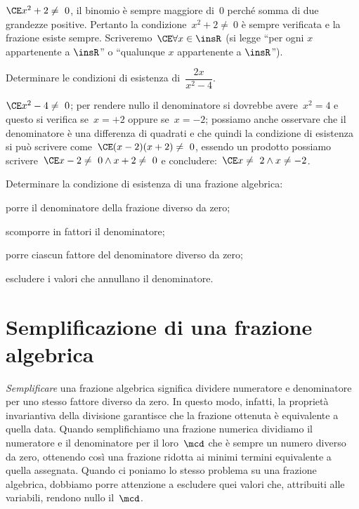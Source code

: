 \begin{exrig}
\begin{esempio}
$\CE x^{2}+2\neq~0$, il binomio è sempre maggiore di~$0$ perché somma di due grandezze positive.
Pertanto la condizione~$x^{2}+2\neq~0$ è sempre verificata e la frazione esiste sempre. Scriveremo~$\CE \forall x\in \insR$ (si legge ``per ogni $x$ appartenente a $\insR$'' o ``qualunque $x$ appartenente a $\insR$'').
 \end{esempio}

 \begin{esempio}
Determinare le condizioni di esistenza di~$\dfrac{2x}{x^{2}-4}$.

$\CE x^{2}-4\neq~0$; per rendere nullo il denominatore si dovrebbe avere~$x^2 = 4$ e questo si verifica se~$x = +2$
oppure se~$x = -2$; possiamo anche osservare che il denominatore è una differenza di quadrati e che quindi la
condizione di esistenza si può scrivere come~$\CE (x-2)(x+2)\neq~0$, essendo un prodotto possiamo
scrivere~$\CE x-2\neq~0\wedge x+2\neq~0$ e concludere:~$\CE x\neq~2\wedge x\neq -2$.
 \end{esempio}
\end{exrig}

\begin{procedura}
Determinare la condizione di esistenza di una frazione algebrica:
\begin{enumeratea}
\item porre il denominatore della frazione diverso da zero;
\item scomporre in fattori il denominatore;
\item porre ciascun fattore del denominatore diverso da zero;
\item escludere i valori che annullano il denominatore.
\end{enumeratea}
\end{procedura}
\ovalbox{\risolvii \ref{ese:14.1}, \ref{ese:14.2}}

\section{Semplificazione di una frazione algebrica}

\emph{Semplificare} una frazione algebrica significa dividere numeratore e denominatore per uno stesso fattore diverso da zero.
In questo modo, infatti, la proprietà invariantiva della divisione garantisce che la frazione ottenuta è equivalente a quella data.
Quando semplifichiamo una frazione numerica dividiamo il numeratore e il denominatore per il loro~$\mcd$
che è sempre un numero diverso da zero, ottenendo così una frazione ridotta ai minimi termini equivalente a quella assegnata.
Quando ci poniamo lo stesso problema su una frazione algebrica, dobbiamo porre attenzione a escludere quei valori
che, attribuiti alle variabili, rendono nullo il~$\mcd$.

